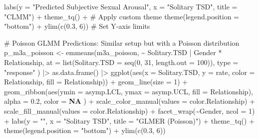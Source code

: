 \documentclass[
  bookmarksnumbered]{article}
\newenvironment{Shaded}{\begin{snugshade}}{\end{snugshade}}
\newcommand{\AttributeTok}[1]{\textcolor[rgb]{0.80,0.80,0.80}{#1}}
\newcommand{\CommentTok}[1]{\textcolor[rgb]{0.50,0.62,0.50}{#1}}
\newcommand{\ConstantTok}[1]{\textcolor[rgb]{0.86,0.64,0.64}{\textbf{#1}}}
\newcommand{\DecValTok}[1]{\textcolor[rgb]{0.86,0.86,0.80}{#1}}
\newcommand{\FloatTok}[1]{\textcolor[rgb]{0.75,0.75,0.82}{#1}}
\newcommand{\FunctionTok}[1]{\textcolor[rgb]{0.94,0.94,0.56}{#1}}
\newcommand{\NormalTok}[1]{\textcolor[rgb]{0.80,0.80,0.80}{#1}}
\newcommand{\OtherTok}[1]{\textcolor[rgb]{0.94,0.94,0.56}{#1}}
\newcommand{\SpecialCharTok}[1]{\textcolor[rgb]{0.86,0.64,0.64}{#1}}
\newcommand{\StringTok}[1]{\textcolor[rgb]{0.80,0.58,0.58}{#1}}
\begin{document}
\begin{Shaded}
\begin{Highlighting}[]
  \FunctionTok{labs}\NormalTok{(}\AttributeTok{y =} \StringTok{"Predicted Subjective Sexual Arousal"}\NormalTok{, }\AttributeTok{x =} \StringTok{"Solitary TSD"}\NormalTok{, }
       \AttributeTok{title =} \StringTok{"CLMM"}\NormalTok{) }\SpecialCharTok{+}
  \FunctionTok{theme\_tq}\NormalTok{() }\SpecialCharTok{+} \CommentTok{\# Apply custom theme}
  \FunctionTok{theme}\NormalTok{(}\AttributeTok{legend.position =} \StringTok{"bottom"}\NormalTok{) }\SpecialCharTok{+}
  \FunctionTok{ylim}\NormalTok{(}\FunctionTok{c}\NormalTok{(}\FloatTok{0.3}\NormalTok{, }\DecValTok{6}\NormalTok{)) }\CommentTok{\# Set Y{-}axis limits}

\CommentTok{\# Poisson GLMM Predictions: Similar setup but with a Poisson distribution}
\NormalTok{p\_m3a\_poisson }\OtherTok{\textless{}{-}} \FunctionTok{emmeans}\NormalTok{(m3a\_poisson, }\SpecialCharTok{\textasciitilde{}}\NormalTok{ Solitary.TSD }\SpecialCharTok{|}\NormalTok{ Gender }\SpecialCharTok{*}\NormalTok{ Relationship,}
  \AttributeTok{at =} \FunctionTok{list}\NormalTok{(}\AttributeTok{Solitary.TSD =} \FunctionTok{seq}\NormalTok{(}\DecValTok{0}\NormalTok{, }\DecValTok{31}\NormalTok{, }\AttributeTok{length.out =} \DecValTok{100}\NormalTok{)), }\AttributeTok{type =} \StringTok{"response"}
\NormalTok{) }\SpecialCharTok{|\textgreater{}}
  \FunctionTok{as.data.frame}\NormalTok{() }\SpecialCharTok{|\textgreater{}}
  \FunctionTok{ggplot}\NormalTok{(}\FunctionTok{aes}\NormalTok{(}\AttributeTok{x =}\NormalTok{ Solitary.TSD, }\AttributeTok{y =}\NormalTok{ rate, }\AttributeTok{color =}\NormalTok{ Relationship, }\AttributeTok{fill =}\NormalTok{ Relationship)) }\SpecialCharTok{+}
  \FunctionTok{geom\_line}\NormalTok{(}\AttributeTok{size =} \DecValTok{1}\NormalTok{) }\SpecialCharTok{+}
  \FunctionTok{geom\_ribbon}\NormalTok{(}\FunctionTok{aes}\NormalTok{(}\AttributeTok{ymin =}\NormalTok{ asymp.LCL, }\AttributeTok{ymax =}\NormalTok{ asymp.UCL, }\AttributeTok{fill =}\NormalTok{ Relationship),}
    \AttributeTok{alpha =} \FloatTok{0.2}\NormalTok{, }\AttributeTok{color =} \ConstantTok{NA}
\NormalTok{  ) }\SpecialCharTok{+}
  \FunctionTok{scale\_color\_manual}\NormalTok{(}\AttributeTok{values =}\NormalTok{ color.Relationship) }\SpecialCharTok{+}
  \FunctionTok{scale\_fill\_manual}\NormalTok{(}\AttributeTok{values =}\NormalTok{ color.Relationship) }\SpecialCharTok{+}
  \FunctionTok{facet\_wrap}\NormalTok{(}\SpecialCharTok{\textasciitilde{}}\NormalTok{Gender, }\AttributeTok{ncol =} \DecValTok{1}\NormalTok{) }\SpecialCharTok{+}
  \FunctionTok{labs}\NormalTok{(}\AttributeTok{y =} \StringTok{""}\NormalTok{, }\AttributeTok{x =} \StringTok{"Solitary TSD"}\NormalTok{, }\AttributeTok{title =} \StringTok{"GLMER (Poisson)"}\NormalTok{) }\SpecialCharTok{+}
  \FunctionTok{theme\_tq}\NormalTok{() }\SpecialCharTok{+}
  \FunctionTok{theme}\NormalTok{(}\AttributeTok{legend.position =} \StringTok{"bottom"}\NormalTok{) }\SpecialCharTok{+}
  \FunctionTok{ylim}\NormalTok{(}\FunctionTok{c}\NormalTok{(}\FloatTok{0.3}\NormalTok{, }\DecValTok{6}\NormalTok{))}


\end{Highlighting}
\end{Shaded}
\end{document}

